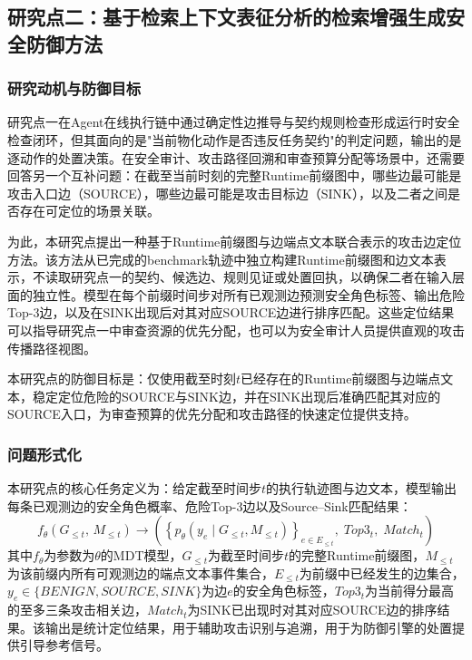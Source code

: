 \subsection{研究点二：基于检索上下文表征分析的检索增强生成安全防御方法}

\subsubsection{研究动机与防御目标}

研究点一在Agent在线执行链中通过确定性边推导与契约规则检查形成运行时安全检查闭环，但其面向的是"当前物化动作是否违反任务契约"的判定问题，输出的是逐动作的处置决策。在安全审计、攻击路径回溯和审查预算分配等场景中，还需要回答另一个互补问题：在截至当前时刻的完整Runtime前缀图中，哪些边最可能是攻击入口边（SOURCE），哪些边最可能是攻击目标边（SINK），以及二者之间是否存在可定位的场景关联。

为此，本研究点提出一种基于Runtime前缀图与边端点文本联合表示的攻击边定位方法。该方法从已完成的benchmark轨迹中独立构建Runtime前缀图和边文本表示，不读取研究点一的契约、候选边、规则见证或处置回执，以确保二者在输入层面的独立性。模型在每个前缀时间步对所有已观测边预测安全角色标签、输出危险Top-3边，以及在SINK出现后对其对应SOURCE边进行排序匹配。这些定位结果可以指导研究点一中审查资源的优先分配，也可以为安全审计人员提供直观的攻击传播路径视图。

本研究点的防御目标是：仅使用截至时刻$t$已经存在的Runtime前缀图与边端点文本，稳定定位危险的SOURCE与SINK边，并在SINK出现后准确匹配其对应的SOURCE入口，为审查预算的优先分配和攻击路径的快速定位提供支持。

\subsubsection{问题形式化}

本研究点的核心任务定义为：给定截至时间步$t$的执行轨迹图与边文本，模型输出每条已观测边的安全角色概率、危险Top-3边以及Source--Sink匹配结果：
\begin{equation}
  f_{\theta}\!\left(G_{\le t},\, M_{\le t}\right)
  \longrightarrow
  \left(
  \left\{p_{\theta}(y_e \mid G_{\le t}, M_{\le t})\right\}_{e \in E_{\le t}},\;
  Top3_t,\;
  Match_t
  \right)
  \label{eq:mdt_task}
\end{equation}
其中$f_{\theta}$为参数为$\theta$的MDT模型，$G_{\le t}$为截至时间步$t$的完整Runtime前缀图，$M_{\le t}$为该前缀内所有可观测边的端点文本事件集合，$E_{\le t}$为前缀中已经发生的边集合，$y_e \in \{BENIGN, SOURCE, SINK\}$为边$e$的安全角色标签，$Top3_t$为当前得分最高的至多三条攻击相关边，$Match_t$为SINK已出现时对其对应SOURCE边的排序结果。该输出是统计定位结果，用于辅助攻击识别与追溯，用于为防御引擎的处置提供引导参考信号。


